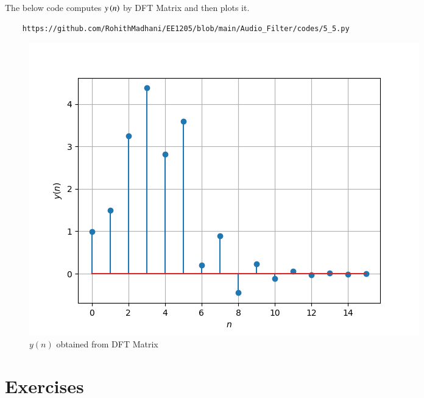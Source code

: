\documentclass[journal,12pt,twocolumn]{IEEEtran}
\theoremstyle{remark}
\begin{document}
\begin{enumerate}[label=\thesection.\arabic*]
The below code computes $y\left(n\right)$ by DFT Matrix and then plots it.
\begin{lstlisting}
    https://github.com/RohithMadhani/EE1205/blob/main/Audio_Filter/codes/5_5.py
\end{lstlisting}
\begin{figure}[H]
\centering
\includegraphics[width=\columnwidth]{figs/5_5.png}
\caption{$y(n)$ obtained from DFT Matrix}
\label{fig:5.5_plot}
\end{figure}
\end{enumerate}

\section{Exercises}
\end{document}
